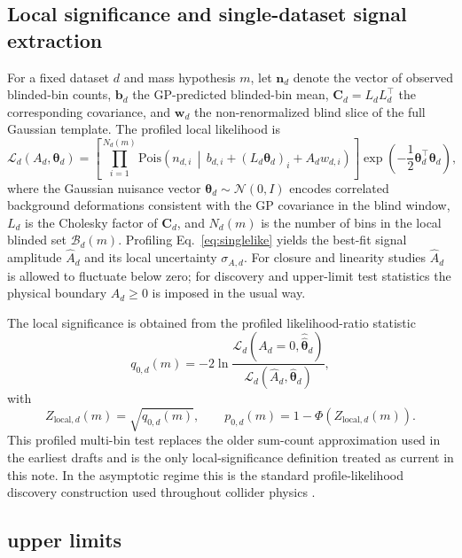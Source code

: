 \subsection{Local significance and single-dataset signal extraction}

For a fixed dataset $d$ and mass hypothesis $m$, let $\bm{n}_d$ denote the vector of
observed blinded-bin counts, $\bm{b}_d$ the GP-predicted blinded-bin mean,
$\bm{C}_d = L_dL_d^\top$ the corresponding covariance, and $\bm{w}_d$ the non-renormalized
blind slice of the full Gaussian template. The profiled local likelihood is
\begin{equation}
\mathcal{L}_d(A_d,\bm{\theta}_d)
=
\left[
\prod_{i=1}^{N_d(m)}
\mathrm{Pois}\!\left(
n_{d,i}\,\middle|\,
b_{d,i} + (L_d\bm{\theta}_d)_i + A_d w_{d,i}
\right)
\right]
\exp\!\left(-\frac{1}{2}\bm{\theta}_d^\top\bm{\theta}_d\right),
\label{eq:singlelike}
\end{equation}
where the Gaussian nuisance vector $\bm{\theta}_d \sim \mathcal{N}(0,I)$ encodes
correlated background deformations consistent with the GP covariance in the blind
window, $L_d$ is the Cholesky factor of $\bm{C}_d$, and $N_d(m)$ is the number of bins
in the local blinded set $\mathcal{B}_d(m)$. Profiling Eq.~\eqref{eq:singlelike}
yields the best-fit signal amplitude
$\hat A_d$ and its local uncertainty $\sigma_{A,d}$. For closure and linearity studies
$\hat A_d$ is allowed to fluctuate below zero; for discovery and upper-limit test
statistics the physical boundary $A_d \ge 0$ is imposed in the usual way.

The local significance is obtained from the profiled likelihood-ratio statistic
\begin{equation}
q_{0,d}(m) = -2\ln
\frac{\mathcal{L}_d(A_d=0,\hat{\hat{\bm{\theta}}}_d)}
{\mathcal{L}_d(\hat A_d,\hat{\bm{\theta}}_d)},
\end{equation}
with
\begin{equation}
Z_{\mathrm{local},d}(m) = \sqrt{q_{0,d}(m)},
\qquad
p_{0,d}(m) = 1-\Phi\!\left(Z_{\mathrm{local},d}(m)\right).
\end{equation}
This profiled multi-bin test replaces the older sum-count approximation used in the
earliest drafts and is the only local-significance definition treated as current in
this note. In the asymptotic regime this is the standard profile-likelihood discovery
construction used throughout collider physics \cite{Cowan1998,Cowan2011}.

\subsection{\texorpdfstring{\CLs}{CLs} upper limits}

